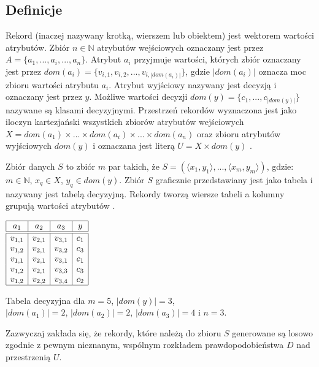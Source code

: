 \documentclass[12pt]{article}
\begin{document}
\subsection{Definicje}
Rekord (inaczej nazywany krotką, wierszem lub obiektem) jest wektorem wartości atrybutów.
Zbiór $n \in \mathbb{N}$ atrybutów wejściowych oznaczany jest przez $A = \{a_1, ..., a_i, ..., a_n\}$.
Atrybut $a_i$ przyjmuje wartości, których zbiór oznaczany jest przez
$dom(a_i) = \{v_{i,1}, v_{i,2}, ..., v_{i,|dom(a_i)|}\}$,
gdzie $|dom(a_i)|$ oznacza moc zbioru wartości atrybutu $a_i$. Atrybut wyjściowy nazywany
jest decyzją i oznaczany jest przez $y$. Możliwe wartości decyzji $dom(y) = \{c_1, ..., c_{|dom(y)|}\}$
nazywane są klasami decyzyjnymi. Przestrzeń rekordów wyznaczona jest jako iloczyn kartezjański
wszystkich zbiorów atrybutów wejściowych $X = dom(a_1) \times ... \times dom(a_i) \times ... \times dom(a_n)$
oraz zbioru atrybutów wyjściowych $dom(y)$ i oznaczana jest literą $U = X \times dom(y)$ \cite{data-mining-with-decision-trees}.

Zbiór danych $S$ to zbiór $m$ par takich, że $S = (\langle x_1, y_1\rangle, ..., \langle x_m, y_m\rangle)$,
gdzie: $m \in \mathbb{N} $, $x_q \in X$, $y_q \in dom(y)$. Zbiór $S$ graficznie przedstawiany jest jako tabela
i nazywany jest tabelą decyzyjną. Rekordy tworzą wiersze tabeli a kolumny grupują wartości atrybutów \cite{data-mining-with-decision-trees}.

\begin{table}[H]
    \centering
    $\begin{array}{|c|c|c|c|}
        \hline 
        a_1 & a_2 & a_3 & y \\
        \hline \hline
        v_{1,1} & v_{2,1} & v_{3,1} & c_1 \\
        v_{1,2} & v_{2,1} & v_{3,2} & c_3 \\
        v_{1,1} & v_{2,1} & v_{3,1} & c_1 \\
        v_{1,2} & v_{2,1} & v_{3,3} & c_3 \\
        v_{1,2} & v_{2,2} & v_{3,4} & c_2 \\
        \hline
    \end{array}$
    \caption{\label{tab:decision-table}Tabela decyzyjna dla $m=5$, $|dom(y)|=3$,\\ $|dom(a_1)|=2$, $|dom(a_2)|=2$, $|dom(a_3)|=4$ i $n=3$.}
\end{table}

Zazwyczaj zakłada się, że rekordy, które należą do
zbioru $S$ generowane są losowo zgodnie z pewnym nieznanym, wspólnym rozkładem prawdopodobieństwa $D$ nad przestrzenią $U$.
\end{document}
